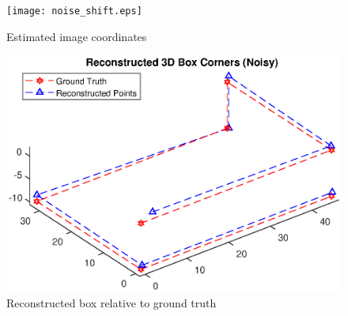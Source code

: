 \documentclass[12pt]{article}
\begin{document}
	\begin{figure}[h]
	\centering %
	\captionsetup{justification=centering}
	\begin{minipage}{0.5\textwidth}
		\centering
		\texttt{[image: noise\_shift.eps]}
		\caption{Estimated image coordinates} \label{noiseshift}
	\end{minipage}\hfill
	\begin{minipage}{0.5\textwidth}
		\centering %
		\includegraphics[width=1\textwidth]{noise_shift_recon.eps}
		\caption{Reconstructed box relative to ground truth} \label{noiserecon}
	\end{minipage}
\end{figure}
\end{document}
